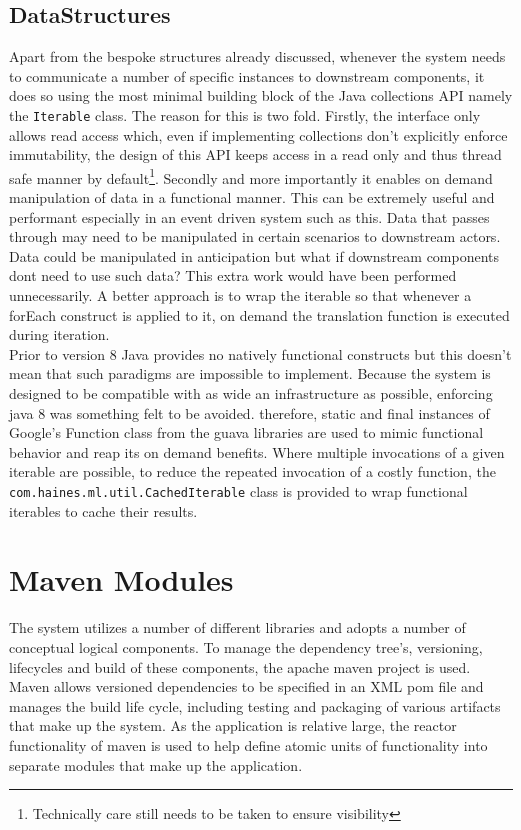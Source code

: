 \documentclass[a4paper,11pt]{scrreprt}
\begin{document}
\subsection{DataStructures}
Apart from the bespoke structures already discussed, whenever the system needs to communicate a number of specific instances to downstream components, it does so using the most minimal building block of the Java collections API namely the \verb|Iterable| class. The reason for this is two fold. Firstly, the interface only allows read access which, even if implementing collections don't explicitly enforce immutability, the design of this API keeps access in a read only and thus thread safe manner by default\footnote{Technically care still needs to be taken to ensure visibility}. Secondly and more importantly it enables on demand manipulation of data in a functional manner. This can be extremely useful and performant especially in an event driven system such as this. Data that passes through may need to be manipulated in certain scenarios to downstream actors. Data could be manipulated in anticipation but what if downstream components dont need to use such data? This extra work would have been performed unnecessarily. A better approach is to wrap the iterable so that whenever a forEach construct is applied to it, on demand the translation function is executed during iteration. \\
Prior to version 8 Java provides no natively functional constructs but this doesn't mean that such paradigms are impossible to implement. Because the system is designed to be compatible with as wide an infrastructure as possible, enforcing java 8 was something felt to be avoided. therefore, static and final instances of Google's Function class from the guava libraries are used to mimic functional behavior and reap its on demand benefits. Where multiple invocations of a given iterable are possible, to reduce the repeated invocation of a costly function, the \verb|com.haines.ml.util.CachedIterable| class is provided to wrap functional iterables to cache their results.

\section{Maven Modules}
The system utilizes a number of different libraries and adopts a number of conceptual logical components. To manage the dependency tree's, versioning, lifecycles and build of these components, the apache maven project\cite{maven} is used. Maven allows versioned dependencies to be specified in an XML pom file and manages the build life cycle, including testing and packaging of various artifacts that make up the system. As the application is relative large, the reactor functionality of maven is used to help define atomic units of functionality into separate modules that make up the application. 
\end{document}
